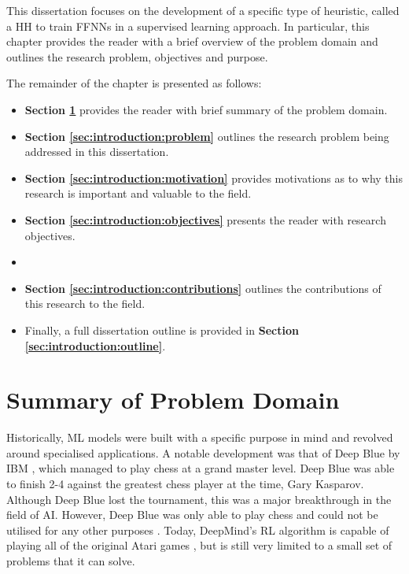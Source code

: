 This dissertation focuses on the development of a specific type of heuristic, called a \acl{HH} to train \acp{FFNN} in a supervised learning approach. In particular, this chapter provides the reader with a brief overview of the problem domain and outlines the research problem, objectives and purpose.

The remainder of the chapter is presented as follows:

\begin{itemize}
      \item \textbf{Section \ref{sec:introduction:summary_problem_domain}} provides the reader with brief summary of the problem domain.

      \item \textbf{Section \ref{sec:introduction:problem}} outlines the research problem being addressed in this dissertation.

      \item \textbf{Section \ref{sec:introduction:motivation}} provides motivations as to why this research is important and valuable to the field.

      \item \textbf{Section \ref{sec:introduction:objectives}} presents the reader with research objectives.
      \item
      \item \textbf{Section \ref{sec:introduction:contributions}} outlines the contributions of this research to the field.

      \item Finally, a full dissertation outline is provided in \textbf{Section \ref{sec:introduction:outline}}.
\end{itemize}


\section{Summary of Problem Domain}
\label{sec:introduction:summary_problem_domain}


Historically, \ac{ML} models were built with a specific purpose in mind and
revolved around specialised applications. A notable development was that of Deep
Blue by IBM \cite{ref:keene:1996}, which managed to play chess at a grand master
level. Deep Blue was able to finish 2-4 against the greatest chess player at the
time, Gary Kasparov. Although Deep Blue lost the tournament, this was a major
breakthrough in the field of \ac{AI}. However, Deep Blue was only able to play
chess and could not be utilised for any other purposes \cite{ref:kelley:2010}.
Today, DeepMind's \ac{RL} algorithm is capable of playing all of the original
Atari games \cite{ref:mnih:2013}, but is still very limited to a small set of
problems that it can solve.

